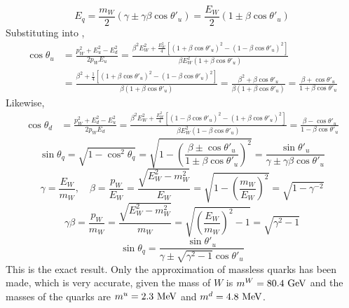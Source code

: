 \documentclass[12pt]{article}
\begin{document}
%
\begin{equation}
  E_q = \frac{m_W}{2} (\gamma \pm \gamma\beta\cos\theta'_u)
  = \frac{E_W}{2} (1 \pm \beta\cos\theta'_u)
\end{equation}
%
Substituting into ,
\begin{align}
  \cos\theta_u &= \frac{p_W^2 + E_u^2 - E_d^2}{2p_WE_u}
  = \frac{\beta^2 E_W^2 + \frac{E^2_W}{4}\left[(1 + \beta\cos\theta'_u)^2 - (1 - \beta\cos\theta'_u)^2\right]}{\beta E_W^2(1 + \beta\cos\theta'_u)}
  \nonumber \\
  &= \frac{\beta^2 + \frac{1}{4}\left[(1 + \beta\cos\theta'_u)^2 - (1 - \beta\cos\theta'_u)^2\right]}{\beta (1 + \beta\cos\theta'_u)}
  = \frac{\beta^2 + \beta\cos\theta'_u}{\beta (1 + \beta\cos\theta'_u)}
  = \frac{\beta + \cos\theta'_u}{1 + \beta\cos\theta'_u}
\end{align}
Likewise,
\begin{align}
  \cos\theta_d &= \frac{p_W^2 + E_d^2 - E_u^2}{2p_WE_d}
  = \frac{\beta^2 E_W^2 + \frac{E^2_W}{4}\left[(1 - \beta\cos\theta'_u)^2 - (1 + \beta\cos\theta'_u)^2\right]}{\beta E_W^2(1 - \beta\cos\theta'_u)}
  = \frac{\beta - \cos\theta'_u}{1 - \beta\cos\theta'_u}
\end{align}
%
\begin{equation}
  \sin\theta_q = \sqrt{1 - \cos^2\theta_q}
  = \sqrt{1 - \left(\frac{\beta \pm \cos\theta'_u}{1 \pm \beta\cos\theta'_u}\right)^2}
  = \frac{\sin\theta'_u}{\gamma \pm \gamma\beta\cos\theta'_u}
\end{equation}
%
\begin{equation}
  \gamma = \frac{E_W}{m_W}, \quad
  \beta = \frac{p_W}{E_W} = \frac{\sqrt{E_W^2-m_W^2}}{E_W}
  = \sqrt{1-\left(\frac{m_W}{E_W}\right)^2}
  = \sqrt{1-\gamma^{-2}}
\end{equation}
\begin{equation}
  \gamma\beta = \frac{p_W}{m_W} = \frac{\sqrt{E_W^2-m_W^2}}{m_W}
  = \sqrt{\left(\frac{E_W}{m_W}\right)^2 - 1}
  = \sqrt{\gamma^2 - 1}
\end{equation}
%
\begin{equation}\label{eq:sin}
  \boxed{
    \sin\theta_q
    = \frac{\sin\theta'_u}{\gamma \pm \sqrt{\gamma^2 - 1}\cos\theta'_u}
  }
\end{equation}
This is the exact result.
Only the approximation of massless quarks has been made, which is very accurate, given the mass of $W$ is $m^W=80.4\ \text{GeV}$ and the masses of the quarks are $m^u=2.3\ \text{MeV}$ and $m^d=4.8\ \text{MeV}$.
\vspace{5mm}
\end{document}
